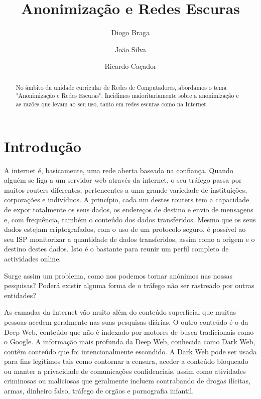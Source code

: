 \documentclass{llncs}
\begin{document}
\mainmatter
\title{Anonimização e Redes Escuras}


\author{Diogo Braga \and João Silva \and Ricardo Caçador}



\date{}


\maketitle
\begin{abstract}
No âmbito da unidade curricular de Redes de Computadores, abordamos o tema "Anonimização e Redes Escuras". Incidimos maioritariamente sobre a anonimização e as razões que levam ao seu uso, tanto em redes escuras como na Internet.
\end{abstract}

\section{Introdução}

A internet é, basicamente, uma rede aberta baseada na confiança. Quando alguém se liga a um servidor web através da internet, o seu tráfego passa por muitos routers diferentes, pertencentes a uma grande variedade de instituições, corporações e indivíduos. A princípio, cada um destes routers tem a capacidade de expor totalmente os seus dados, os endereços de destino e envio de mensagens e, com frequência, também o conteúdo dos dados transferidos. Mesmo que os seus dados estejam criptografados, com o uso de um protocolo seguro, é possível ao seu ISP monitorizar a quantidade de dados transferidos, assim como a origem e o destino destes dados. Isto é o bastante para reunir um perfil completo de actividades online. \cite{toreanoni}

Surge assim um problema, como nos podemos tornar anónimos nas nossas pesquisas? Poderá existir alguma forma de o tráfego não ser rastreado por outras entidades?

As camadas da Internet vão muito além do conteúdo superficial que muitas pessoas acedem geralmente nas suas pesquisas diárias. O outro conteúdo é o da Deep Web, conteúdo que não é indexado por motores de busca tradicionais como o Google. A informação mais profunda da Deep Web, conhecida como Dark Web, contêm conteúdo que foi intencionalmente escondido. A Dark Web pode ser usada para fins legítimos tais como contornar a censura, aceder a conteúdo bloqueado ou manter a privacidade de comunicações confidenciais, assim como atividades criminosas ou maliciosas que geralmente incluem contrabando de drogas ilícitas, armas, dinheiro falso, tráfego de orgãos e pornografia infantil.
\end{document}
